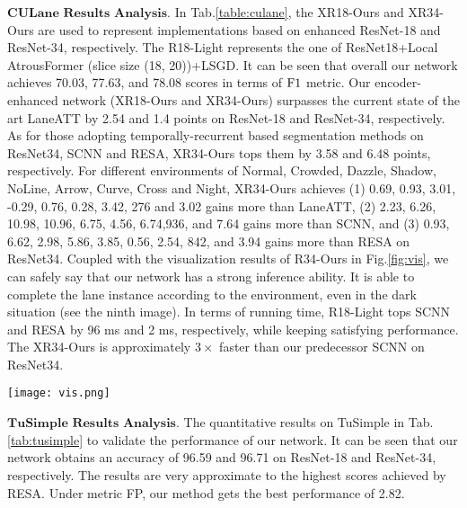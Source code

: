 \documentclass[preprint,12pt,review]{elsarticle}
\begin{document}
$\textbf{CULane Results Analysis.}$ In Tab.\ref{table:culane}, the XR18-Ours and XR34-Ours are used to represent implementations based on enhanced ResNet-18 and ResNet-34, respectively. The R18-Light represents the one of ResNet18+Local AtrousFormer (slice size (18, 20))+LSGD. It can be seen that overall our network achieves 70.03, 77.63, and 78.08 scores in terms of $\rm{F1}$ metric. Our encoder-enhanced network (XR18-Ours and XR34-Ours) surpasses the current state of the art LaneATT by 2.54 and 1.4 points on ResNet-18 and ResNet-34, respectively. As for those adopting temporally-recurrent based segmentation methods on ResNet34, SCNN and RESA, XR34-Ours tops them by 3.58 and 6.48 points, respectively. For different environments of Normal, Crowded, Dazzle, Shadow, NoLine, Arrow, Curve, Cross and Night, 
XR34-Ours achieves (1) 0.69, 0.93, 3.01, -0.29, 0.76, 0.28, 3.42, 276 and 3.02 gains more than LaneATT, (2) 2.23, 6.26, 10.98, 10.96, 6.75, 4.56, 6.74,936, and 7.64 gains more than SCNN, and (3) 0.93, 6.62, 2.98, 5.86, 3.85, 0.56, 2.54, 842, and 3.94 gains more than RESA on ResNet34.  Coupled with the visualization results of R34-Ours in Fig.\ref{fig:vis}, we can safely say that our network has a strong inference ability. It is able to complete the lane instance according to the environment, even in the dark situation (see the ninth image).
In terms of running time, R18-Light tops SCNN and RESA by 96 ms and 2 ms, respectively, while keeping satisfying performance. The XR34-Ours is approximately $3\times$ faster than our predecessor SCNN on ResNet34.

\begin{figure*}[tbp]
	\texttt{[image: vis.png]}\\ \centering
	\caption{Visualization results of R34-Ours under nine scenarios of CULane,  namely, Normal, Crowded, Dazzle, Shadow, NoLine, Arrow, Curve, Cross and Night (from left to right, from top to bottom, best viewed by zooming in). Note that in the Cross situation, only FP is calculated.} 		
	\label{fig:vis}
\end{figure*}

$\textbf{TuSimple Results Analysis.}$ The quantitative results on TuSimple in Tab.\ref{tab:tusimple} to validate the performance of our network. It can be seen that our network obtains an accuracy of 96.59 and 96.71 on ResNet-18 and ResNet-34, respectively. The results are very approximate to the highest scores achieved by RESA. Under metric FP, our method gets the best performance of 2.82.
\end{document}
